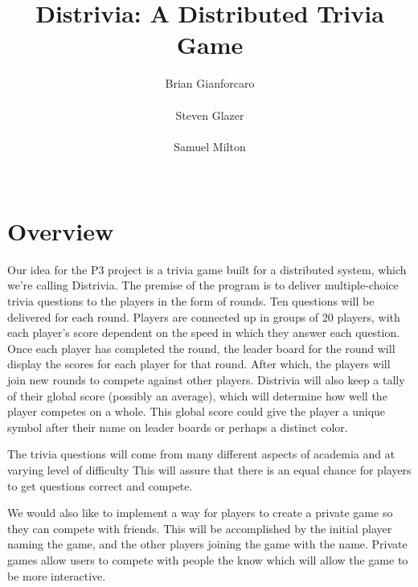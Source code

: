 \documentclass{dependencies/acm_proc_article-sp}
\begin{document}
\title{ Distrivia: A Distributed Trivia Game }
\author{
\alignauthor
Brian Gianforcaro \\
       \\
\alignauthor
Steven Glazer \\
       \\
\alignauthor
Samuel Milton \\
       \\
}
\maketitle


\section{Overview}
Our idea for the P3 project is a trivia game built for a distributed system, which we're calling Distrivia.
The premise of the program is to deliver multiple-choice trivia questions to the players in the form of rounds.
Ten questions will be delivered for each round.
Players are connected up in groups of 20 players, with each player's score dependent on the speed in which they answer each question.
Once each player has completed the round, the leader board for the round will display the scores for each player for that round.
After which, the players will join new rounds to compete against other players.
Distrivia will also keep a tally of their global score (possibly an average), which will determine how well the player competes on a whole.
This global score could give the player a unique symbol after their name on leader boards or perhaps a distinct color.


The trivia questions will come from many different aspects of academia and at varying level of difficulty
This will assure that there is an equal chance for players to get questions correct and compete.


We would also like to implement a way for players to create a private game so they can compete with friends.
This will be accomplished by the initial player naming the game, and the other players joining the game with the name.
Private games allow users to compete with people the know which will allow the game to be more interactive.
\end{document}
